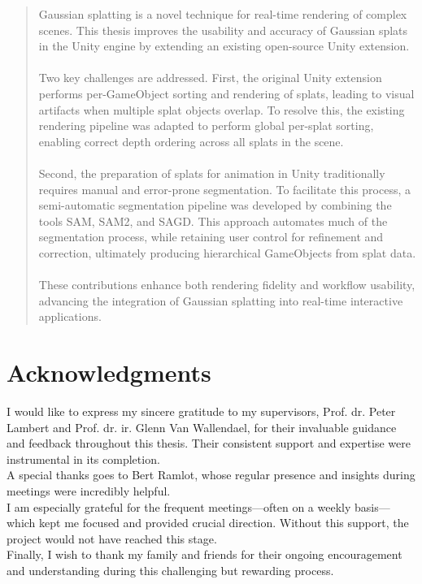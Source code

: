 \documentclass[12pt]{article}
\begin{document}
\begin{abstract}
Gaussian splatting is a novel technique for real-time rendering of complex scenes. This thesis improves the usability and accuracy of Gaussian splats in the Unity engine by extending an existing open-source Unity extension.
\\\\
Two key challenges are addressed. First, the original Unity extension performs per-GameObject sorting and rendering of splats, leading to visual artifacts when multiple splat objects overlap. To resolve this, the existing rendering pipeline was adapted to perform global per-splat sorting, enabling correct depth ordering across all splats in the scene.
\\\\
Second, the preparation of splats for animation in Unity traditionally requires manual and error-prone segmentation. To facilitate this process, a semi-automatic segmentation pipeline was developed by combining the tools SAM, SAM2, and SAGD. This approach automates much of the segmentation process, while retaining user control for refinement and correction, ultimately producing hierarchical GameObjects from splat data.
\\\\
These contributions enhance both rendering fidelity and workflow usability, advancing the integration of Gaussian splatting into real-time interactive applications.

\end{abstract}
\newpage

\newpage

\section*{Acknowledgments}
I would like to express my sincere gratitude to my supervisors, Prof. dr. Peter Lambert and Prof. dr. ir. Glenn Van Wallendael, for their invaluable guidance and feedback throughout this thesis. Their consistent support and expertise were instrumental in its completion.
\\
A special thanks goes to Bert Ramlot, whose regular presence and insights during meetings were incredibly helpful.
\\
I am especially grateful for the frequent meetings—often on a weekly \linebreak basis—which kept me focused and provided crucial direction. Without this support, the project would not have reached this stage.
\\
Finally, I wish to thank my family and friends for their ongoing encouragement and understanding during this challenging but rewarding process.
\newpage
\end{document}
